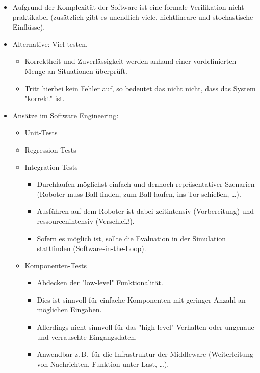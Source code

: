 \documentclass[a4paper, 11pt, accentcolor = tud3b]{tudreport}
\newcommand{\zB}{z.\,B.~}
\begin{document}
			\begin{itemize}
				\item Aufgrund der Komplexität der Software ist eine formale Verifikation nicht praktikabel (zusätzlich gibt es unendlich viele, nichtlineare und stochastische Einflüsse).
				\item Alternative: Viel testen.
					\begin{itemize}
						\item Korrektheit und Zuverlässigkeit werden anhand einer vordefinierten Menge an Situationen überprüft.
						\item Tritt hierbei kein Fehler auf, so bedeutet das nicht nicht, dass das System "korrekt" ist.
					\end{itemize}
				\item Ansätze im Software Engineering:
					\begin{itemize}
						\item Unit-Tests
						\item Regression-Tests
						\item Integration-Tests
							\begin{itemize}
								\item Durchlaufen möglichst einfach und dennoch repräsentativer Szenarien (Roboter muss Ball finden, zum Ball laufen, ins Tor schießen, \dots).
								\item Ausführen auf dem Roboter ist dabei zeitintensiv (Vorbereitung) und ressourcenintensiv (Verschleiß).
								\item Sofern es möglich ist, sollte die Evaluation in der Simulation stattfinden (Software-in-the-Loop).
							\end{itemize}
						\item Komponenten-Tests
							\begin{itemize}
								\item Abdecken der "low-level" Funktionalität.
								\item Dies ist sinnvoll für einfache Komponenten mit geringer Anzahl an möglichen Eingaben.
								\item Allerdings nicht sinnvoll für das "high-level" Verhalten oder ungenaue und verrauschte Eingangsdaten.
								\item Anwendbar \zB für die Infrastruktur der Middleware (Weiterleitung von Nachrichten, Funktion unter Last, \dots).
							\end{itemize}
					\end{itemize}
			\end{itemize}
\end{document}
